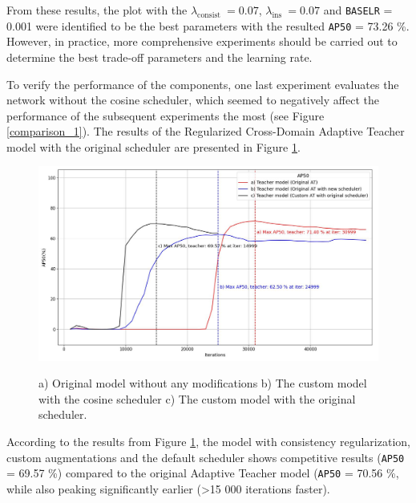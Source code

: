From these results, the plot with the $\lambda_{\text {consist }} = 0.07$, $\lambda_{\text {ins }} = 0.07$ and \texttt{BASE\textunderscore LR} = 0.001 were identified to be the best parameters with the resulted \texttt{AP50} = 73.26 \%. However, in practice, more comprehensive experiments should be carried out to determine the best trade-off parameters and the learning rate. 

To verify the performance of the components, one last experiment evaluates the network without the cosine scheduler, which seemed to negatively affect the performance of the subsequent experiments the most (see Figure \ref{comparison_1}). The results of the Regularized Cross-Domain Adaptive Teacher model with the original scheduler are presented in Figure \ref{myModel_withOrigSched}.

\begin{figure}[htb]
	\begin{center}
		\includegraphics[width=14cm]{./AP50_myModel_origScheduler.jpg}
	\end{center}
	\caption{a) Original model without any modifications b) The custom model with the cosine scheduler c) The custom model with the original scheduler.}
	\begin{center}
		\label{myModel_withOrigSched}
	\end{center}
\end{figure}
\FloatBarrier

According to the results from Figure \ref{myModel_withOrigSched}, the model with consistency regularization, custom augmentations and the default scheduler shows competitive results (\texttt{AP50} = 69.57 \%) compared to the original Adaptive Teacher model (\texttt{AP50} = 70.56 \%, while also peaking significantly earlier (>15 000 iterations faster).  


